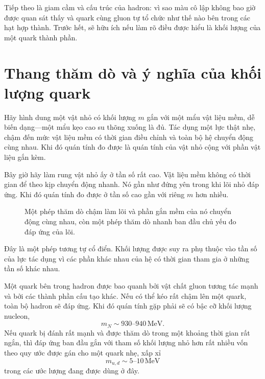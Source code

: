 Tiếp theo là giam cầm và cấu trúc của hadron: vì sao màu cô lập không bao giờ được quan sát thấy và quark cùng gluon tự tổ chức như thế nào bên trong các hạt hợp thành. Trước hết, sẽ hữu ích nếu làm rõ điều được hiểu là khối lượng của một quark thành phần.

\section{Thang thăm dò và ý nghĩa của khối lượng quark}

Hãy hình dung một vật nhỏ có khối lượng \(m\) gắn với một mẩu vật liệu mềm, dễ biến dạng---một mẩu kẹo cao su thõng xuống là đủ. Tác dụng một lực thật nhẹ, chậm đến mức vật liệu mềm có thời gian điều chỉnh và toàn bộ hệ chuyển động cùng nhau. Khi đó quán tính đo được là quán tính của vật nhỏ cộng với phần vật liệu gắn kèm.

Bây giờ hãy làm rung vật nhỏ ấy ở tần số rất cao. Vật liệu mềm không có thời gian để theo kịp chuyển động nhanh. Nó gần như đứng yên trong khi lõi nhỏ đáp ứng. Khi đó quán tính đo được ở tần số cao gần với riêng \(m\) hơn nhiều.

\begin{figure}[h]
\centering
{}
\caption{Một phép thăm dò chậm làm lõi và phần gắn mềm của nó chuyển động cùng nhau, còn một phép thăm dò nhanh ban đầu chủ yếu đo đáp ứng của lõi.}
\end{figure}

Đây là một phép tương tự cổ điển. Khối lượng được suy ra phụ thuộc vào tần số của lực tác dụng vì các phần khác nhau của hệ có thời gian tham gia ở những tần số khác nhau.

Một quark bên trong hadron được bao quanh bởi vật chất gluon tương tác mạnh và bởi các thành phần cấu tạo khác. Nếu có thể kéo rất chậm lên một quark, toàn bộ hadron sẽ đáp ứng. Khi đó quán tính gặp phải sẽ có bậc cỡ khối lượng nucleon,
\begin{equation}
m_N\sim930\text{--}940\,\mathrm{MeV}.
\end{equation}
Nếu quark bị đánh rất mạnh và được thăm dò trong một khoảng thời gian rất ngắn, thì đáp ứng ban đầu gắn với tham số khối lượng nhỏ hơn rất nhiều vốn theo quy ước được gán cho một quark nhẹ, xấp xỉ
\begin{equation}
m_{u,d}\sim5\text{--}10\,\mathrm{MeV}
\end{equation}
trong các ước lượng đang được dùng ở đây.

